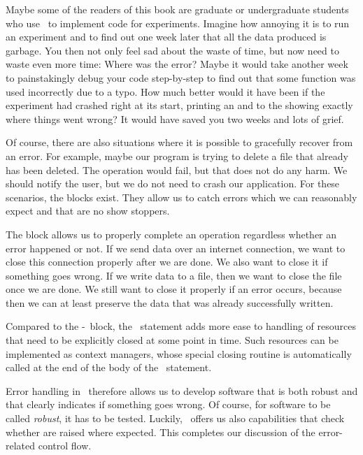 Maybe some of the readers of this book are graduate or undergraduate students who use \python\ to implement code for experiments.
Imagine how annoying it is to run an experiment and to find out one week later that all the data produced is garbage.
You then not only feel sad about the waste of time, but now need to waste even more time:
Where was the error?
Maybe it would take another week to painstakingly debug your code step-by-step to find out that some function was used incorrectly due to a typo.
How much better would it have been if the experiment had crashed right at its start, printing an  and  to the  showing exactly where things went wrong?
It would have saved you two weeks and lots of grief.

Of course, there are also situations where it is possible to gracefully recover from an error.
For example, maybe our program is trying to delete a file that already has been deleted.
The operation would fail, but that does not do any harm.
We should notify the user, but we do not need to crash our application.
For these scenarios, the  blocks exist.
They allow us to catch errors which we can reasonably expect and that are no show stoppers.

The  block allows us to properly complete an operation regardless whether an error happened or not.
If we send data over an internet connection, we want to close this connection properly after we are done.
We also want to close it if something goes wrong.
If we write data to a file, then we want to close the file once we are done.
We still want to close it properly if an error occurs, because then we can at least preserve the data that was already successfully written.

Compared to the -~block, the ~statement adds more ease to handling of resources that need to be explicitly closed at some point in time.
Such resources can be implemented as context managers, whose special closing routine is automatically called at the end of the body of the ~statement.

Error handling in \python\ therefore allows us to develop software that is both robust and that clearly indicates if something goes wrong.
Of course, for software to be called \emph{robust}, it has to be tested.
Luckily, \pytest\ offers us also  capabilities that check whether  are raised where expected.
This completes our discussion of the error-related control flow.%
\endhsection%
%
\FloatBarrier%
\endhsection%
%
